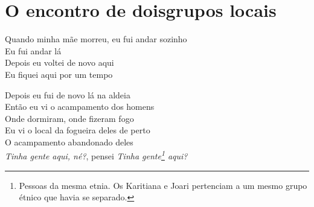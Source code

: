 \vspace*{\fill}

 \chapter[O encontro de dois grupos locais]{O encontro de dois\break grupos locais}

  \noindent Quando minha mãe morreu, eu fui andar sozinho\\
  Eu fui andar lá\\
  Depois eu voltei de novo aqui\\
  Eu fiquei aqui por um tempo
 
 \smallskip
 \begin{center}\end{center}
 \smallskip
 
\noindent   Depois eu fui de novo lá na aldeia\\
  Então eu vi o acampamento dos homens\\
  Onde dormiram, onde fizeram fogo\\
  Eu vi o local da fogueira deles de perto\\
  O acampamento abandonado deles\\
  \textit{Tinha gente aqui, né?}, pensei \textit{Tinha gente\footnote{Pessoas da
   mesma etnia. Os Karitiana e Joari pertenciam a um mesmo grupo étnico
   que havia se separado.} aqui?}

\smallskip
 \begin{center}\end{center}
 \smallskip
 
